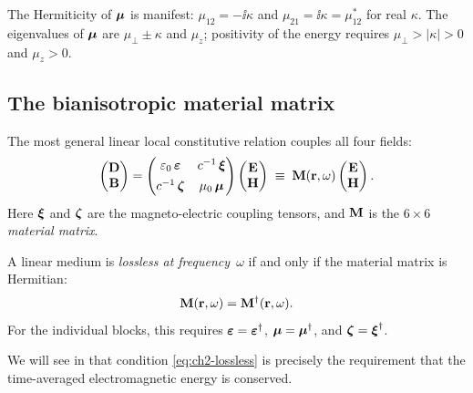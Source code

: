 \begin{remark}
The Hermiticity of $\boldsymbol{\mu}$ is manifest:
$\mu_{12}=-\ii\kappa$ and $\mu_{21}=\ii\kappa=\mu_{12}^*$ for real
$\kappa$.  The eigenvalues of $\boldsymbol{\mu}$ are $\mu_\perp\pm\kappa$ and
$\mu_z$; positivity of the energy requires
$\mu_\perp>|\kappa|>0$ and $\mu_z>0$.
\end{remark}

\subsection{The bianisotropic material matrix}
\label{sec:ch2-bianisotropic}

The most general linear local constitutive relation couples all four
fields:
\begin{equation}\label{eq:ch2-bianisotropic}
  \begin{pmatrix} \mathbf{D} \\ \mathbf{B} \end{pmatrix}
  =
  \begin{pmatrix}
    \varepsilon_0\,\boldsymbol{\varepsilon} & c^{-1}\,\boldsymbol{\xi} \\[4pt]
    c^{-1}\,\boldsymbol{\zeta} & \mu_0\,\boldsymbol{\mu}
  \end{pmatrix}
  \begin{pmatrix} \mathbf{E} \\ \mathbf{H} \end{pmatrix}
  \;\equiv\;
  \mathbf{M}(\mathbf{r},\omega)
  \begin{pmatrix} \mathbf{E} \\ \mathbf{H} \end{pmatrix}.
\end{equation}
Here $\boldsymbol{\xi}$ and $\boldsymbol{\zeta}$ are the magneto-electric coupling tensors, and
$\mathbf{M}$ is the $6\times 6$ \emph{material matrix}.

\begin{definition}
  \label{def:ch2-lossless}
  A linear medium is \emph{lossless at frequency~$\omega$} if and only
  if the material matrix is Hermitian:
  \begin{equation}\label{eq:ch2-lossless}
    \mathbf{M}(\mathbf{r},\omega) = \mathbf{M}^\dagger(\mathbf{r},\omega).
  \end{equation}
  For the individual blocks, this requires $\boldsymbol{\varepsilon}=\boldsymbol{\varepsilon}^\dagger$,
  $\boldsymbol{\mu}=\boldsymbol{\mu}^\dagger$, and $\boldsymbol{\zeta}=\boldsymbol{\xi}^\dagger$.
\end{definition}

We will see in  that condition
\eqref{eq:ch2-lossless} is precisely the requirement that the
time-averaged electromagnetic energy is conserved.


